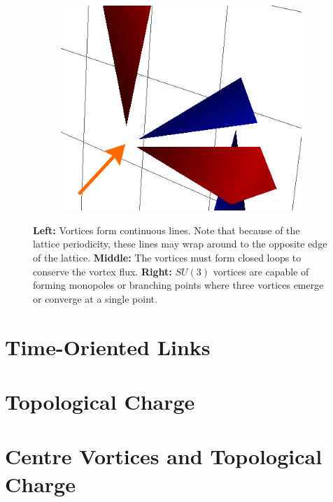 \begin{figure}[htb!]
\begin{subfigure}[b]{0.3\textwidth}
    \end{subfigure}\hfill
    \begin{subfigure}[b]{0.3\textwidth}
	\includegraphics[width=\textwidth]{./plaqt1_monopole.png}
    \end{subfigure}
    \caption{\label{fig:VortexFeatures} \textbf{Left:} Vortices form continuous lines. Note that because of the lattice periodicity, these lines may wrap around to the opposite edge of the lattice. \textbf{Middle:} The vortices must form closed loops to conserve the vortex flux. \textbf{Right:} $SU(3)$ vortices are capable of forming monopoles or branching points where three vortices emerge or converge at a single point.}
  \end{figure}
\section{Time-Oriented Links}
\section{Topological Charge}\label{sec:TopChargeVis}
\section{Centre Vortices and Topological Charge}
